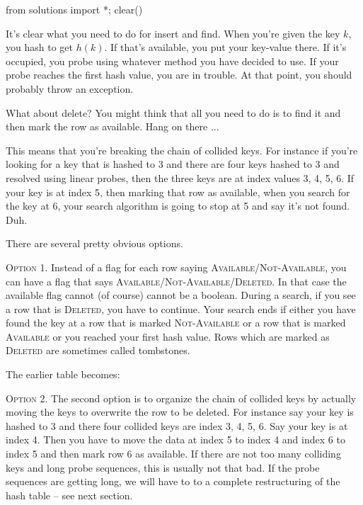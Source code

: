 \begin{python0}
from solutions import *; clear()
\end{python0}

It's clear what you need to do for insert and find.
When you're given the key $k$, you hash to get $h(k)$.
If that's available, you put your key-value there.
If it's occupied, you probe using whatever method you have decided to use.
If your probe reaches the first hash value, you are in trouble.
At that point, you should probably throw an exception.

What about delete?
You might think that all you need to do is to find it
and then mark the row as available.
Hang on there ...

This means that you're breaking the chain of collided keys.
For instance if you're looking for a key that is hashed to
3 and there are four keys hashed to 3 and resolved using linear 
probes, then the three keys are at index values 3, 4, 5, 6.
If your key is at index 5, then marking that row as available,
when you search for the key at 6, your search algorithm is
going to stop at 5 and say it's not found. Duh.

There are several pretty obvious options.

\textsc{Option 1.}
Instead of a flag for each row saying
\textsc{Available}/\textsc{Not-Available},
you can have a flag that says
\textsc{Available}/\textsc{Not-Available}/\textsc{Deleted}.
In that case the available flag cannot (of course) cannot be a boolean.
During a search, if you see a row that is \textsc{Deleted},
you have to continue.
Your search ends if either you have found the key at a row that is
marked \textsc{Not-Available} or a row that is marked
\textsc{Available} or you reached
your first hash value.
Rows which are marked as \textsc{Deleted} are sometimes called tombstones.

The earlier table becomes:


\textsc{Option 2.}
The second option is to organize the chain of collided keys by 
actually moving the keys to overwrite the row to be deleted.
For instance say your key is hashed to 3 and there four 
collided keys are index 3, 4, 5, 6.
Say your key is at index 4.
Then you have to move the data at index 5 to index 4 and index 6 to index 5
and then mark row 6 as available.
If there are not too many colliding keys and long probe sequences,
this is usually not that bad.
If the probe sequences are getting long, we will have to to a 
complete restructuring of the hash table -- see next section.

